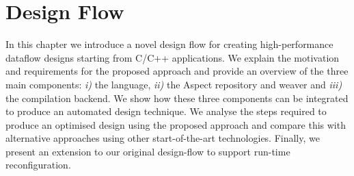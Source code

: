\chapter{Design Flow}
\label{sec:design-flow}

In this chapter we introduce a novel design flow for creating
high-performance dataflow designs starting from C/C++ applications. We
explain the motivation and requirements for the proposed approach and
provide an overview of the three main components: \emph{i)} the
\FAST{} language, \emph{ii)} the Aspect repository and weaver and
\emph{iii)} the compilation backend. We show how these three
components can be integrated to produce an automated design
technique. We analyse the steps required to produce an optimised
design using the proposed approach and compare this with alternative
approaches using other start-of-the-art technologies. Finally, we
present an extension to our original design-flow to support run-time
reconfiguration.

\begin{comment}
\section{Overview}

Figure \ref{fig:design-flow-overview} provides a brief overview of the
proposed design flow. First a high level application is produced as
the input to our flow. This is then partitioned into a software part
and a hardware part to run on the dataflow accelerator. A dataflow
kernel is generated from the original description. Aspect descriptions
are used to control the optimisation process.

Thus the inputs to the design flow are:
\begin{itemize}
\item High-level source specification
\item Aspect descriptions for controlling the compilation process
\end{itemize}

\begin{figure}[!h]
  \texttt{[image: figs/asap13-design-flow.pdf\_tex]}
  \caption{Proposed approach for aspect-driven compilation of dataflow
    designs.}
  \label{fig:design-flow-overview}
\end{figure}

The design flow produces as its output a number of implementations based on
requirements specified through aspects.

The following algorithm describes the operation of the proposed design flow:

\begin{lstlisting}
  for (in as do als)
\end{lstlisting}
\end{comment}

